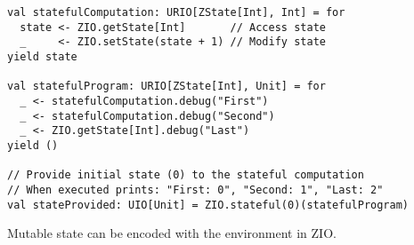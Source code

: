 \begin{algorithm}

\begin{verbatim}
val statefulComputation: URIO[ZState[Int], Int] = for
  state <- ZIO.getState[Int]       // Access state
  _     <- ZIO.setState(state + 1) // Modify state
yield state

val statefulProgram: URIO[ZState[Int], Unit] = for
  _ <- statefulComputation.debug("First")
  _ <- statefulComputation.debug("Second")
  _ <- ZIO.getState[Int].debug("Last")
yield ()

// Provide initial state (0) to the stateful computation
// When executed prints: "First: 0", "Second: 1", "Last: 2"
val stateProvided: UIO[Unit] = ZIO.stateful(0)(statefulProgram)
\end{verbatim}

\caption{Mutable state can be encoded with the environment in ZIO. \label{zio:state}}
\end{algorithm}